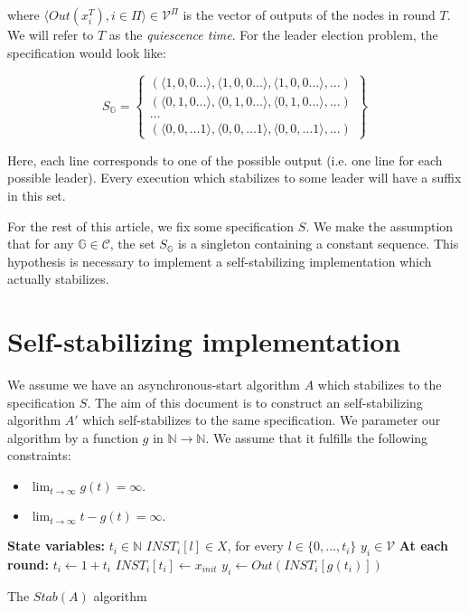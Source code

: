 \documentclass[11pt,letterpaper]{article}
\begin{document}
where $\langle Out(x^T_i), i \in \Pi \rangle \in \mathcal{V}^\Pi$ is the vector of outputs of the nodes in round $T$.
We will refer to $T$ as the \textit{quiescence time}.
For the leader election problem, the specification would look like:

$$S_\mathds{G} = \left \{ \begin{array}{l}
	(\langle 1, 0, 0 \dots \rangle, \langle 1, 0, 0 \dots \rangle, \langle 1, 0, 0 \dots \rangle, \dots) \\
	(\langle 0, 1, 0 \dots \rangle, \langle 0, 1, 0 \dots \rangle, \langle 0, 1, 0 \dots \rangle, \dots) \\
	\dots \\
	(\langle 0, 0, \dots 1 \rangle, \langle 0, 0, \dots 1 \rangle, \langle 0, 0, \dots 1 \rangle, \dots)
\end{array} \right \}$$

Here, each line corresponds to one of the possible output (i.e. one line for each possible leader).
Every execution which stabilizes to some leader will have a suffix in this set.

For the rest of this article, we fix some specification $S$.
We make the assumption that for any $\mathds{G} \in \mathcal{C}$, the set $S_\mathds{G}$ is a singleton containing a constant sequence.
This hypothesis is necessary to implement a self-stabilizing implementation which actually stabilizes.

\section{Self-stabilizing implementation}

We assume we have an asynchronous-start algorithm $A$ which stabilizes to the specification $S$.
The aim of this document is to construct an self-stabilizing algorithm $A'$ which self-stabilizes to the same specification.
We parameter our algorithm by a function $g$ in $\mathds{N} \rightarrow \mathds{N}$.
We assume that it fulfills the following constraints:
\begin{itemize}
	\item $\lim_{t \rightarrow \infty} g(t) = \infty.$
	\item $\lim_{t \rightarrow \infty} t-g(t) = \infty.$
\end{itemize}

\begin{algorithm}[htb]
	\DontPrintSemicolon
	\textbf{State variables:} \;
	\Indp
		$t_i \in \mathds{N}$ \;
		$INST_i[l] \in X$, for every $l \in \{0, \dots, t_i\}$ \;
		$y_i \in \mathcal{V}$ \;
	\BlankLine
	\Indm
	\textbf{At each round:} \;
	\Indp
		$t_i \leftarrow 1+t_i$ \;
		$INST_i[t_i] \leftarrow x_{init}$ \;
		$y_i \leftarrow Out(INST_i[g(t_i)])$ \;
	\Indm
	\caption{The $Stab(A)$ algorithm} 
\end{algorithm}
\end{document}
